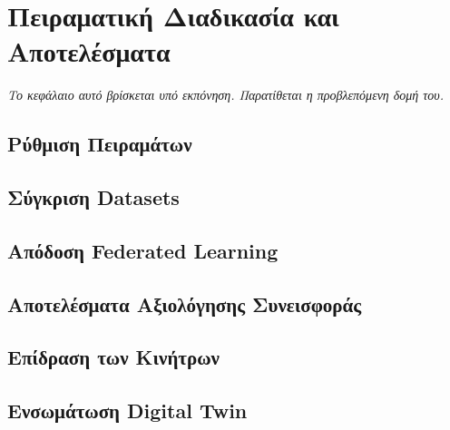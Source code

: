 \chapter{Πειραματική Διαδικασία και Αποτελέσματα}
\label{ch:experiments}

\noindent\textit{Το κεφάλαιο αυτό βρίσκεται υπό εκπόνηση. Παρατίθεται η προβλεπόμενη δομή του.}

\section{Ρύθμιση Πειραμάτων}
\section{Σύγκριση Datasets}
\section{Απόδοση Federated Learning}
\section{Αποτελέσματα Αξιολόγησης Συνεισφοράς}
\section{Επίδραση των Κινήτρων}
\section{Ενσωμάτωση Digital Twin}

